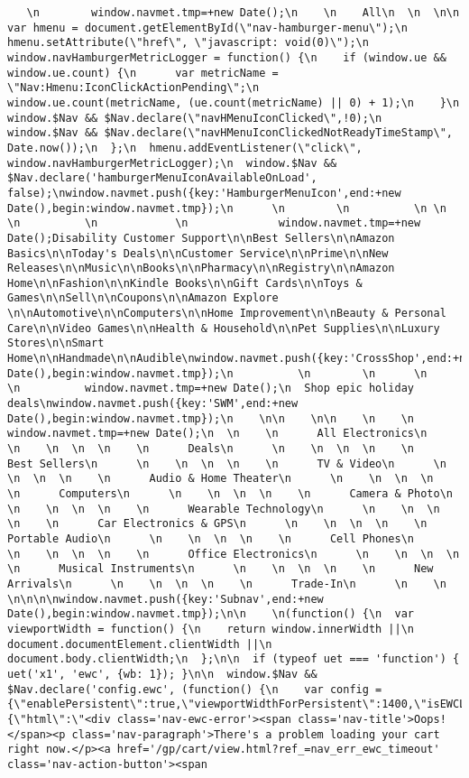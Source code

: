 \documentclass[
]{article}
\begin{document}
\begin{verbatim}
   \n        window.navmet.tmp=+new Date();\n    \n    All\n  \n  \n\n  var hmenu = document.getElementById(\"nav-hamburger-menu\");\n  hmenu.setAttribute(\"href\", \"javascript: void(0)\");\n  window.navHamburgerMetricLogger = function() {\n    if (window.ue && window.ue.count) {\n      var metricName = \"Nav:Hmenu:IconClickActionPending\";\n      window.ue.count(metricName, (ue.count(metricName) || 0) + 1);\n    }\n    window.$Nav && $Nav.declare(\"navHMenuIconClicked\",!0);\n    window.$Nav && $Nav.declare(\"navHMenuIconClickedNotReadyTimeStamp\", Date.now());\n  };\n  hmenu.addEventListener(\"click\", window.navHamburgerMetricLogger);\n  window.$Nav && $Nav.declare('hamburgerMenuIconAvailableOnLoad', false);\nwindow.navmet.push({key:'HamburgerMenuIcon',end:+new Date(),begin:window.navmet.tmp});\n      \n        \n          \n \n \n          \n            \n              window.navmet.tmp=+new Date();Disability Customer Support\n\nBest Sellers\n\nAmazon Basics\n\nToday's Deals\n\nCustomer Service\n\nPrime\n\nNew Releases\n\nMusic\n\nBooks\n\nPharmacy\n\nRegistry\n\nAmazon Home\n\nFashion\n\nKindle Books\n\nGift Cards\n\nToys & Games\n\nSell\n\nCoupons\n\nAmazon Explore \n\nAutomotive\n\nComputers\n\nHome Improvement\n\nBeauty & Personal Care\n\nVideo Games\n\nHealth & Household\n\nPet Supplies\n\nLuxury Stores\n\nSmart Home\n\nHandmade\n\nAudible\nwindow.navmet.push({key:'CrossShop',end:+new Date(),begin:window.navmet.tmp});\n          \n        \n      \n      \n          window.navmet.tmp=+new Date();\n  Shop epic holiday deals\nwindow.navmet.push({key:'SWM',end:+new Date(),begin:window.navmet.tmp});\n    \n\n    \n\n    \n    \n      window.navmet.tmp=+new Date();\n  \n    \n      All Electronics\n      \n    \n  \n  \n    \n      Deals\n      \n    \n  \n  \n    \n      Best Sellers\n      \n    \n  \n  \n    \n      TV & Video\n      \n    \n  \n  \n    \n      Audio & Home Theater\n      \n    \n  \n  \n    \n      Computers\n      \n    \n  \n  \n    \n      Camera & Photo\n      \n    \n  \n  \n    \n      Wearable Technology\n      \n    \n  \n  \n    \n      Car Electronics & GPS\n      \n    \n  \n  \n    \n      Portable Audio\n      \n    \n  \n  \n    \n      Cell Phones\n      \n    \n  \n  \n    \n      Office Electronics\n      \n    \n  \n  \n    \n      Musical Instruments\n      \n    \n  \n  \n    \n      New Arrivals\n      \n    \n  \n  \n    \n      Trade-In\n      \n    \n  \n\n\n\nwindow.navmet.push({key:'Subnav',end:+new Date(),begin:window.navmet.tmp});\n\n    \n(function() {\n  var viewportWidth = function() {\n    return window.innerWidth ||\n      document.documentElement.clientWidth ||\n      document.body.clientWidth;\n  };\n\n  if (typeof uet === 'function') {  uet('x1', 'ewc', {wb: 1}); }\n\n  window.$Nav && $Nav.declare('config.ewc', (function() {\n    var config = {\"enablePersistent\":true,\"viewportWidthForPersistent\":1400,\"isEWCLogging\":1,\"isEWCStateExpanded\":true,\"EWCStateReason\":\"fixed\",\"isSmallScreenEnabled\":true,\"isFreshCustomer\":false,\"errorContent\":{\"html\":\"<div class='nav-ewc-error'><span class='nav-title'>Oops!</span><p class='nav-paragraph'>There's a problem loading your cart right now.</p><a href='/gp/cart/view.html?ref_=nav_err_ewc_timeout' class='nav-action-button'><span 
\end{verbatim}
\end{document}
